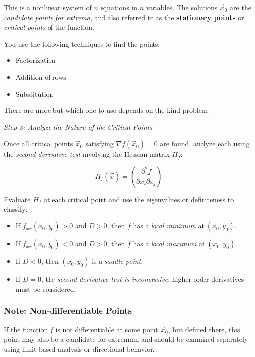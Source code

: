 This is a nonlinear system of \( n \) equations in \( n \) variables. The solutions \( \vec{x}_0 \) 
are the \emph{candidate points for extrema}, and also referred to as the 
\textbf{stationary points} or \emph{critical points} of the function.
\vspace{\baselineskip}

You use the following techniques to find the points: 
\begin{itemize}[label=\(-\)]
    \item Factorization
    \item Addition of rows
    \item Substitution
\end{itemize}

There are more but which one to use depends on the kind problem.

\emph{Step 3: Analyze the Nature of the Critical Points}

Once all critical points \( \vec{x}_0 \) satisfying \( \nabla f(\vec{x}_0) = 0 \) are found, analyze each using
 the \emph{second derivative test} involving the Hessian matrix \( H_f \):

\[
H_f(\vec{x}) = \left( \frac{\partial^2 f}{\partial x_i \partial x_j} \right)
\]

Evaluate \( H_f \) at each critical point and use the eigenvalues or definiteness to classify:

\begin{itemize}[label=\(-\)]
    \item If \( f_{xx}(x_0, y_0) > 0 \) and \( D > 0 \), then \( f \) has a \emph{local minimum} at \( (x_0, y_0) \).
    \item If \( f_{xx}(x_0, y_0) < 0 \) and \( D > 0 \), then \( f \) has a \emph{local maximum} at \( (x_0, y_0) \).
    \item If \( D < 0 \), then \( (x_0, y_0) \) is a \emph{saddle point}.
    \item If \( D = 0 \), the \emph{second derivative test is inconclusive}; higher-order derivatives must be considered.
\end{itemize}

\subsubsection{Note: Non-differentiable Points}

If the function \( f \) is not differentiable at some point \( \vec{x}_0 \), but defined there, this point may also be a 
candidate for extremum and should be examined separately using limit-based analysis or directional behavior.

